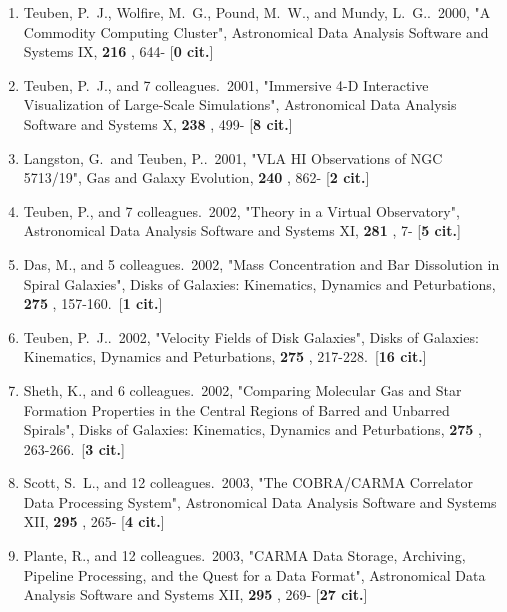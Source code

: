 \documentclass[11pt,letterpaper]{article}
\begin{document}
\begin{enumerate}[resume,label=\textbf{\arabic*}.]
\item  
Teuben, P.~J., Wolfire, M.~G., Pound, M.~W., and Mundy, L.~G..\  2000,  "A 
Commodity Computing Cluster", Astronomical Data Analysis Software and 
Systems IX,  {\bf 216} , 644- [{\bf 0 cit.}] 



\item  
Teuben, P.~J., and 7 colleagues.\  2001,  "Immersive 4-D Interactive 
Visualization of Large-Scale Simulations", Astronomical Data Analysis 
Software and Systems X,  {\bf 238} , 499- [{\bf 8 cit.}] 

\item  
Langston, G.~and Teuben, P..\  2001,  "VLA HI Observations of NGC 5713/19", 
Gas and Galaxy Evolution,  {\bf 240} , 862- [{\bf 2 cit.}] 



\item  
Teuben, P., and 7 colleagues.\  2002,  "Theory in a Virtual Observatory", 
Astronomical Data Analysis Software and Systems XI,  {\bf 281} , 7- [{\bf 5 
cit.}] 


\item  
Das, M., and 5 colleagues.\  2002,  "Mass Concentration and Bar Dissolution 
in Spiral Galaxies", Disks of Galaxies: Kinematics, Dynamics and 
Peturbations,  {\bf 275} , 157-160.\  [{\bf 1 cit.}] 

\item  
Teuben, P.~J..\  2002,  "Velocity Fields of Disk Galaxies", Disks of 
Galaxies: Kinematics, Dynamics and Peturbations,  {\bf 275} , 217-228.\  
[{\bf 16 cit.}] 

\item  
Sheth, K., and 6 colleagues.\  2002,  "Comparing Molecular Gas and Star 
Formation Properties in the Central Regions of Barred and Unbarred 
Spirals", Disks of Galaxies: Kinematics, Dynamics and Peturbations,  {\bf 
275} , 263-266.\  [{\bf 3 cit.}] 

\item  
Scott, S.~L., and 12 colleagues.\  2003,  "The COBRA/CARMA Correlator Data 
Processing System", Astronomical Data Analysis Software and Systems XII,  
{\bf 295} , 265- [{\bf 4 cit.}] 

\item  
Plante, R., and 12 colleagues.\  2003,  "CARMA Data Storage, Archiving, 
Pipeline Processing, and the Quest for a Data Format", Astronomical Data 
Analysis Software and Systems XII,  {\bf 295} , 269- [{\bf 27 cit.}] 


\end{enumerate}
\end{document}

